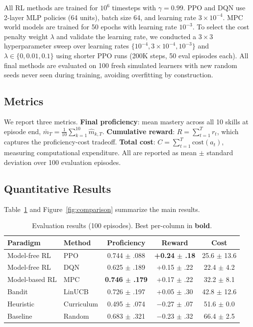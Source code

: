 \documentclass{article}
\begin{document}
All RL methods are trained for $10^6$ timesteps with $\gamma\!=\!0.99$. PPO and DQN use 2-layer MLP policies (64 units), batch size 64, and learning rate $3\!\times\!10^{-4}$. MPC world models are trained for 50 epochs with learning rate $10^{-3}$. To select the cost penalty weight $\lambda$ and validate the learning rate, we conducted a $3\!\times\!3$ hyperparameter sweep over learning rates $\{10^{-4}, 3\!\times\!10^{-4}, 10^{-3}\}$ and $\lambda \in \{0, 0.01, 0.1\}$ using shorter PPO runs (200K steps, 50 eval episodes each). All final methods are evaluated on 100 fresh simulated learners with new random seeds never seen during training, avoiding overfitting by construction.

\subsection{Metrics}

We report three metrics. \textbf{Final proficiency}: mean mastery across all 10 skills at episode end, $\bar{m}_T = \frac{1}{10}\sum_{k=1}^{10}\hat{m}_{k,T}$. \textbf{Cumulative reward}: $R = \sum_{t=1}^{T} r_t$, which captures the proficiency-cost tradeoff. \textbf{Total cost}: $C = \sum_{t=1}^T \text{cost}(a_t)$, measuring computational expenditure. All are reported as mean $\pm$ standard deviation over 100 evaluation episodes.

\subsection{Quantitative Results}

Table~\ref{tab:results} and Figure~\ref{fig:comparison} summarize the main results.

\begin{table}[h]
\vspace{-0.5em}
\centering
\small
\caption{Evaluation results (100 episodes). Best per-column in \textbf{bold}.}
\label{tab:results}
\vspace{0.3em}
\begin{tabular}{@{}llccc@{}}
\toprule
Paradigm & Method & Proficiency & Reward & Cost \\
\midrule
Model-free RL   & PPO        & 0.744 $\pm$ .088 & \textbf{+0.24 $\pm$ .18} & 25.6 $\pm$ 13.6 \\
Model-free RL   & DQN        & 0.625 $\pm$ .189 & +0.15 $\pm$ .22 & 22.4 $\pm$ 4.2 \\
Model-based RL  & MPC        & \textbf{0.746 $\pm$ .179} & +0.17 $\pm$ .22 & 32.2 $\pm$ 8.1 \\
Bandit          & LinUCB     & 0.726 $\pm$ .197 & +0.05 $\pm$ .30 & 42.8 $\pm$ 12.6 \\
Heuristic       & Curriculum & 0.495 $\pm$ .074 & $-$0.27 $\pm$ .07 & 51.6 $\pm$ 0.0 \\
Baseline        & Random     & 0.683 $\pm$ .321 & $-$0.23 $\pm$ .32 & 66.4 $\pm$ 2.5 \\
\bottomrule
\end{tabular}
\vspace{-0.5em}
\end{table}
\end{document}

